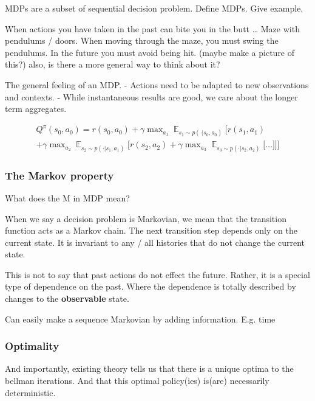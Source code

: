 MDPs are a subset of sequential decision problem. Define MDPs. Give
example.

When actions you have taken in the past can bite you in the butt \ldots{}
Maze with pendulums / doors. When moving through the maze, you must
swing the pendulums. In the future you must avoid being hit. (maybe make
a picture of this?) also, is there a more general way to think about it?

The general feeling of an MDP. - Actions need to be adapted to new
observations and contexts. - While instantaneous results are good, we
care about the longer term aggregates.

\begin{align*}
Q^{\pi}(s_0, a_0) = r(s_0, a_0)
+ \gamma \mathop{\text{max}}_{a_1} \mathop{\mathbb E}_{s_1\sim p(\cdot | s_0, a_0)} \Bigg[ r(s_1, a_1) \\
+ \gamma \mathop{\text{max}}_{a_2} \mathop{\mathbb E}_{s_2\sim p(\cdot | s_1, a_1)} \bigg[r(s_2, a_2)
+ \gamma \mathop{\text{max}}_{a_3} \mathop{\mathbb E}_{s_3\sim p(\cdot | s_2, a_2)} \Big[
\dots \Big] \bigg] \Bigg]
\end{align*}

\hypertarget{the-markov-property}{%
\subsubsection{The Markov property}\label{the-markov-property}}

What does the M in MDP mean?

When we say a decision problem is Markovian, we mean that the transition
function acts as a Markov chain. The next transition step depends only
on the current state. It is invariant to any / all histories that do not
change the current state.

This is not to say that past actions do not effect the future. Rather,
it is a special type of dependence on the past. Where the dependence is
totally described by changes to the \textbf{observable} state.

Can easily make a sequence Markovian by adding information. E.g.
time

\hypertarget{optimality}{%
\subsubsection{Optimality}\label{optimality}}

And importantly, existing theory tells us that there is a unique optima to the bellman iterations.
And that this optimal policy(ies) is(are) necessarily deterministic.


